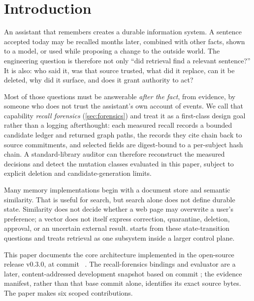 \section{Introduction}
\label{sec:introduction}

An assistant that remembers creates a durable information system. A sentence accepted today may be recalled months later, combined with other facts, shown to a model, or used while proposing a change to the outside world. The engineering question is therefore not only ``did retrieval find a relevant sentence?'' It is also: who said it, was that source trusted, what did it replace, can it be deleted, why did it surface, and does it grant authority to act?

Most of those questions must be answerable \emph{after the fact}, from evidence, by someone who does not trust the assistant's own account of events. We call that capability \emph{recall forensics} (\cref{sec:forensics}) and treat it as a first-class design goal rather than a logging afterthought: each measured recall records a bounded candidate ledger and returned graph paths, the records they cite chain back to source commitments, and selected fields are digest-bound to a per-subject hash chain. A standard-library auditor can therefore reconstruct the measured decisions and detect the mutation classes evaluated in this paper, subject to explicit deletion and candidate-generation limits.

Many memory implementations begin with a document store and semantic similarity. That is useful for search, but search alone does not define durable state. Similarity does not decide whether a web page may overwrite a user's preference; a vector does not itself express correction, quarantine, deletion, approval, or an uncertain external result. \system{} starts from these state-transition questions and treats retrieval as one subsystem inside a larger control plane.


This paper documents the core architecture implemented in the open-source \system{} release v0.3.0, at commit ~\cite{aetnamem2026}. The recall-forensics bindings and evaluator are a later, content-addressed development snapshot based on commit ; the evidence manifest, rather than that base commit alone, identifies its exact source bytes. The paper makes six scoped contributions.

